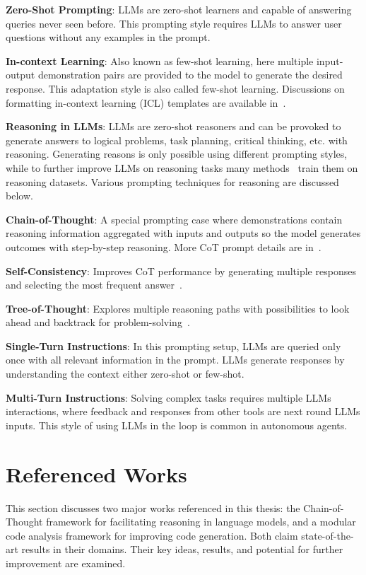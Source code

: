 \documentclass[a4paper,oneside]{book}
\begin{document}
\textbf{Zero-Shot Prompting}: LLMs are zero-shot learners and capable of answering queries never seen before. This prompting style requires LLMs to answer user questions without any examples in the prompt.

\textbf{In-context Learning}: Also known as few-shot learning, here multiple input-output demonstration pairs are provided to the model to generate the desired response. This adaptation style is also called few-shot learning. Discussions on formatting in-context learning (ICL) templates are available in~\cite{dong2022survey, zhao2023survey, wang2022super, chung2022scaling}.

\textbf{Reasoning in LLMs}: LLMs are zero-shot reasoners and can be provoked to generate answers to logical problems, task planning, critical thinking, etc. with reasoning. Generating reasons is only possible using different prompting styles, while to further improve LLMs on reasoning tasks many methods~\cite{chung2022scaling, iyer2022opt} train them on reasoning datasets. Various prompting techniques for reasoning are discussed below.

\textbf{Chain-of-Thought}: A special prompting case where demonstrations contain reasoning information aggregated with inputs and outputs so the model generates outcomes with step-by-step reasoning. More CoT prompt details are in~\cite{huang2022towards, wei2022chain, kim2023cot}.

\textbf{Self-Consistency}: Improves CoT performance by generating multiple responses and selecting the most frequent answer~\cite{wang2022self}.

\textbf{Tree-of-Thought}: Explores multiple reasoning paths with possibilities to look ahead and backtrack for problem-solving~\cite{yao2023tree}.

\textbf{Single-Turn Instructions}: In this prompting setup, LLMs are queried only once with all relevant information in the prompt. LLMs generate responses by understanding the context either zero-shot or few-shot.

\textbf{Multi-Turn Instructions}: Solving complex tasks requires multiple LLMs interactions, where feedback and responses from other tools are next round LLMs inputs. This style of using LLMs in the loop is common in autonomous agents.

\chapter{Referenced Works}
This section discusses two major works referenced in this thesis: the Chain-of-Thought framework for facilitating reasoning in language models, and a modular code analysis framework for improving code generation. Both claim state-of-the-art results in their domains. Their key ideas, results, and potential for further improvement are examined.
\end{document}
